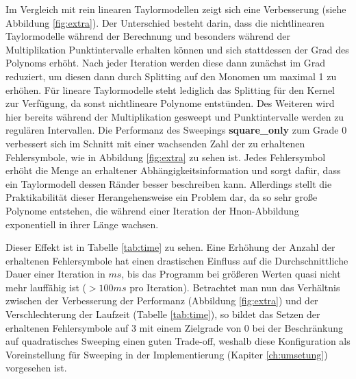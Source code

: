 Im Vergleich mit rein linearen Taylormodellen zeigt sich eine Verbesserung (siehe Abbildung \ref{fig:extra}). Der Unterschied besteht darin, dass die nichtlinearen Taylormodelle während der Berechnung und besonders während der Multiplikation Punktintervalle erhalten können und sich stattdessen der Grad des Polynoms erhöht. Nach jeder Iteration werden diese dann zunächst im Grad reduziert, um diesen dann durch Splitting auf den Monomen um maximal 1 zu erhöhen. Für lineare Taylormodelle steht lediglich das Splitting für den Kernel zur Verfügung, da sonst nichtlineare Polynome entstünden. Des Weiteren wird hier bereits während der Multiplikation gesweept und Punktintervalle werden zu regulären Intervallen. Die Performanz des Sweepings \textbf{square\_only} zum Grade 0 verbessert sich im Schnitt mit einer wachsenden Zahl der zu erhaltenen Fehlersymbole, wie in Abbildung \ref{fig:extra} zu sehen ist. Jedes Fehlersymbol erhöht die Menge an erhaltener Abhängigkeitsinformation und sorgt dafür, dass ein Taylormodell dessen Ränder besser beschreiben kann. Allerdings stellt die Praktikabilität dieser Herangehensweise ein Problem dar, da so sehr große Polynome entstehen, die während einer Iteration der H\e non-Abbildung exponentiell in ihrer Länge wachsen. 
 


 Dieser Effekt ist in Tabelle \ref{tab:time} zu sehen. Eine Erhöhung der Anzahl der erhaltenen Fehlersymbole hat einen drastischen Einfluss auf die Durchschnittliche Dauer einer Iteration in $ms$, bis das Programm bei größeren Werten quasi nicht mehr lauffähig ist ($>100ms$ pro Iteration). Betrachtet man nun das Verhältnis zwischen der Verbesserung der Performanz (Abbildung \ref{fig:extra}) und der Verschlechterung der Laufzeit (Tabelle \ref{tab:time}), so bildet das Setzen der erhaltenen Fehlersymbole auf 3 mit einem Zielgrade von 0 bei der Beschränkung auf quadratisches Sweeping einen guten Trade-off, weshalb diese Konfiguration als Voreinstellung für Sweeping in der Implementierung (Kapiter \ref{ch:umsetung}) vorgesehen ist.
 
